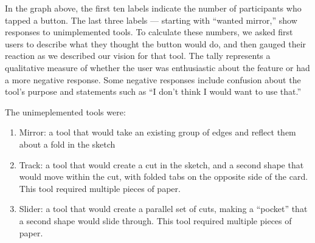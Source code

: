
In the graph above, the first ten labels indicate the number of
participants who tapped a button. The last three labels --- starting
with ``wanted mirror,'' show responses to unimplemented tools. To
calculate these numbers, we asked first users to describe what they
thought the button would do, and then gauged their reaction as we
described our vision for that tool. The tally represents a qualitative
measure of whether the user was enthusiastic about the feature or had a
more negative response. Some negative responses include confusion about
the tool's purpose and statements such as ``I don't think I would want
to use that.''

The unimeplemented tools were:

\begin{enumerate}
\def\labelenumi{\arabic{enumi}.}
\itemsep1pt\parskip0pt
\item
  Mirror: a tool that would take an existing group of edges and reflect
  them about a fold in the sketch
\item
  Track: a tool that would create a cut in the sketch, and a second
  shape that would move within the cut, with folded tabs on the opposite
  side of the card. This tool required multiple pieces of paper.
\item
  Slider: a tool that would create a parallel set of cuts, making a
  ``pocket'' that a second shape would slide through. This tool required
  multiple pieces of paper.
\end{enumerate}

